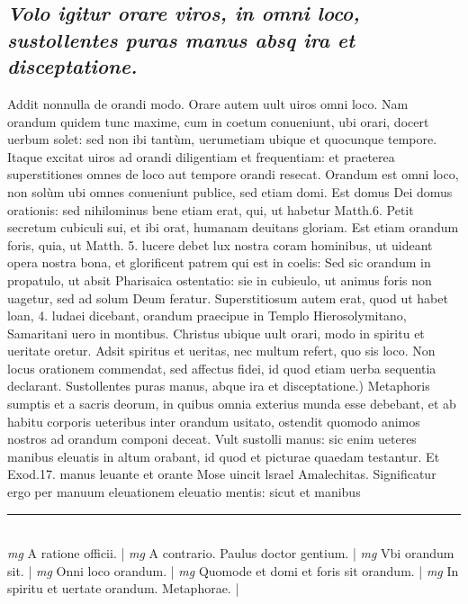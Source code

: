 \documentclass{article}
\begin{document}
\begin{pages}
\subsection*{\textit{Volo igitur orare viros, in omni loco, sustollentes puras manus absq ira et disceptatione. }}\pstart Addit nonnulla de orandi modo. Orare autem uult uiros omni loco. Nam orandum quidem tunc maxime, cum in coetum conueniunt, ubi orari, docert uerbum solet: sed non ibi tantùm, uerumetiam ubique  et quocunque  tempore. Itaque  excitat uiros ad orandi diligentiam et frequentiam: et praeterea superstitiones omnes de loco aut tempore orandi resecat. Orandum est omni loco, non solùm ubi omnes conueniunt publice, sed etiam domi. Est domus Dei domus orationis: sed nihilominus bene etiam erat, qui, ut habetur Matth.6. Petit secretum cubiculi sui, et ibi orat, humanam deuitans gloriam. Est etiam orandum foris, quia, ut Matth. 5. lucere debet lux nostra coram hominibus, ut uideant opera nostra bona, et glorificent patrem qui est in coelis: Sed sic orandum in propatulo, ut absit Pharisaica ostentatio: sie in cubieulo, ut animus foris non uagetur, sed ad solum Deum feratur. Superstitiosum autem erat, quod ut habet loan, 4. ludaei dicebant, orandum praecipue in Templo Hierosolymitano, Samaritani uero in montibus. Christus ubique  uult orari, modo in spiritu et ueritate oretur. Adsit spiritus et ueritas, nec multum refert, quo sis loco. Non locus orationem commendat, sed affectus fidei, id quod etiam uerba sequentia declarant.  \pend\pstart Sustollentes puras manus, abque  ira et disceptatione.) Metaphoris sumptis et a sacris deorum, in quibus omnia exterius munda esse debebant, et ab habitu corporis ueteribus inter orandum usitato, ostendit quomodo animos nostros ad orandum componi deceat. Vult sustolli manus: sic enim ueteres manibus eleuatis in altum orabant, id quod et picturae quaedam testantur. Et Exod.17. manus leuante et orante Mose uincit lsrael Amalechitas. Significatur ergo per manuum eleuationem eleuatio mentis: sicut et manibus  \pend
\vspace{0.5cm}\noindent
\vspace{0.2cm}\rule{1cm}{0.2pt}\\ 
\hspace{0.2cm}\textit{mg}
\footnotesize A ratione officii. 
\normalsize| 
\hspace{0.2cm}\textit{mg}
\footnotesize A contrario. Paulus doctor gentium. 
\normalsize| 
\hspace{0.2cm}\textit{mg}
\footnotesize Vbi orandum sit. 
\normalsize| 
\hspace{0.2cm}\textit{mg}
\footnotesize Onni loco orandum. 
\normalsize| 
\hspace{0.2cm}\textit{mg}
\footnotesize Quomode et domi et foris sit orandum. 
\normalsize| 
\hspace{0.2cm}\textit{mg}
\footnotesize In spiritu et uertate orandum. Metaphorae. 
\normalsize| 

\end{pages}
\end{document}
